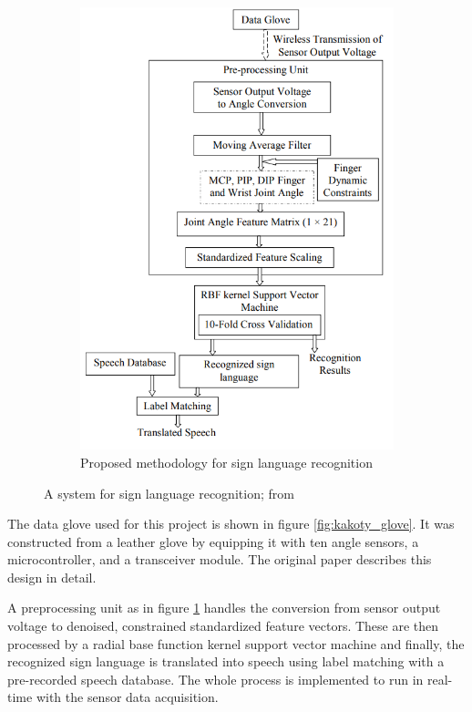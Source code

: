 \documentclass[hyperref, bachelorofscience]{cgvpub}
\begin{document}
\begin{figure}
\begin{subfigure}{.43\linewidth}
		\includegraphics[width=\linewidth]{../pics/kakoty_principle}
		\caption{Proposed methodology for sign language recognition}
		\label{fig:kakoty_principle}
	\end{subfigure}
	\caption[A system for sign language recognition]{A system for sign language recognition; from \cite{kakoty18}}
	\label{fig:kakoty}
\end{figure}

The data glove used for this project is shown in figure \ref{fig:kakoty_glove}. It was constructed from a leather glove by equipping it with ten angle sensors, a microcontroller, and a transceiver module. The original paper describes this design in detail.

A preprocessing unit as in figure \ref{fig:kakoty_principle} handles the conversion from sensor output voltage to denoised, constrained standardized feature vectors. These are then processed by a radial base function kernel support vector machine and finally, the recognized sign language is translated into speech using label matching with a pre-recorded speech database. The whole process is implemented to run in real-time with the sensor data acquisition.
\end{document}
